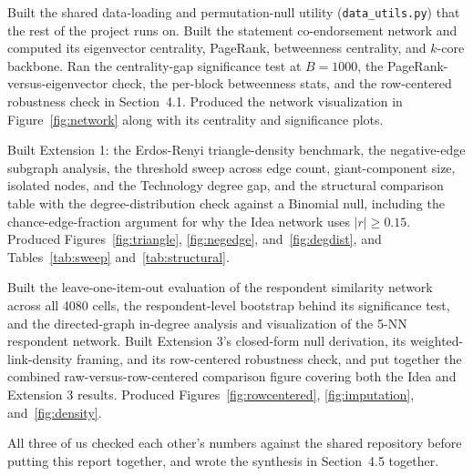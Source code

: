 \documentclass[11pt]{article}
\begin{document}
\begin{description}[leftmargin=2.2cm, style=nextline]
\item[Abhishek] Built the shared data-loading and permutation-null utility (\texttt{data\_utils.py})
that the rest of the project runs on. Built the statement co-endorsement network and computed its
eigenvector centrality, PageRank, betweenness centrality, and $k$-core backbone. Ran the
centrality-gap significance test at $B=1000$, the PageRank-versus-eigenvector check, the per-block
betweenness stats, and the row-centered robustness check in Section~4.1. Produced the network
visualization in Figure~\ref{fig:network} along with its centrality and significance plots.

\item[Shreyas] Built Extension 1: the Erdos-Renyi triangle-density benchmark,
the negative-edge subgraph analysis, the threshold sweep across edge count, giant-component size,
isolated nodes, and the Technology degree gap, and the structural comparison table with the
degree-distribution check against a Binomial null, including the chance-edge-fraction argument
for why the Idea network uses $|r| \geq 0.15$. Produced Figures~\ref{fig:triangle}, \ref{fig:negedge},
and~\ref{fig:degdist}, and Tables~\ref{tab:sweep} and~\ref{tab:structural}.

\item[Sampath] Built the leave-one-item-out evaluation of the respondent similarity network across all
4080 cells, the respondent-level bootstrap behind its significance test, and the directed-graph
in-degree analysis and visualization of the 5-NN respondent network. Built Extension 3's closed-form
null derivation, its weighted-link-density framing, and its row-centered robustness check, and put
together the combined raw-versus-row-centered comparison figure covering both the Idea and Extension
3 results. Produced Figures~\ref{fig:rowcentered}, \ref{fig:imputation}, and~\ref{fig:density}.
\end{description}

All three of us checked each other's numbers against the shared repository before putting this report
together, and wrote the synthesis in Section~4.5 together.
\end{document}
